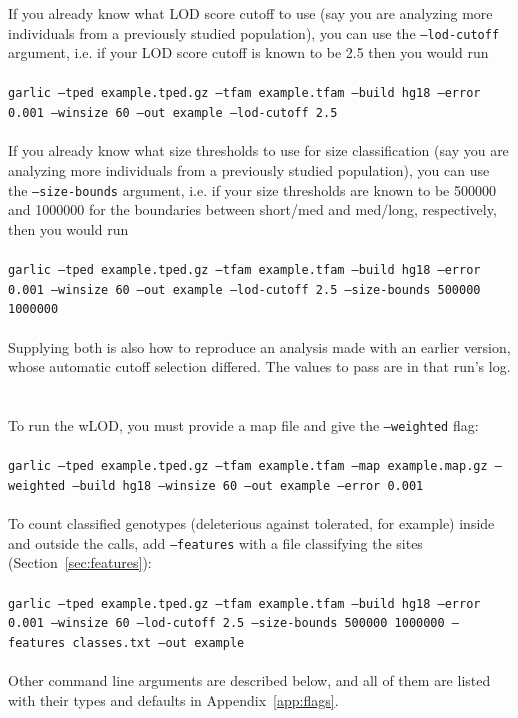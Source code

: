 \documentclass[12pt]{article}%
\begin{document}
\noindent If you already know what LOD score cutoff to use (say you are
analyzing more individuals from a previously studied population), you can use
the {\tt --lod-cutoff} argument, i.e. if your LOD score cutoff is known to be
2.5 then you would run
~\\\\
{\tt garlic --tped example.tped.gz --tfam example.tfam --build hg18 --error 0.001 --winsize 60 --out example --lod-cutoff 2.5}
~\\\\
\noindent If you already know what size thresholds to use for size
classification (say you are analyzing more individuals from a previously
studied population), you can use the {\tt --size-bounds} argument, i.e. if your
size thresholds are known to be 500000 and 1000000 for the boundaries between
short/med and med/long, respectively, then you would run
~\\\\
{\tt garlic --tped example.tped.gz --tfam example.tfam --build hg18 --error 0.001 --winsize 60 --out example --lod-cutoff 2.5 --size-bounds 500000 1000000}
~\\\\
\noindent Supplying both is also how to reproduce an analysis made with an
earlier version, whose automatic cutoff selection differed.  The values to
pass are in that run's log.
~\\\\
\noindent To run the wLOD, you must provide a map file and give the
{\tt --weighted} flag:
~\\\\
{\tt garlic --tped example.tped.gz --tfam example.tfam --map example.map.gz --weighted --build hg18 --winsize 60 --out example --error 0.001}
~\\\\
\noindent To count classified genotypes (deleterious against tolerated, for
example) inside and outside the calls, add {\tt --features} with a file
classifying the sites (Section~\ref{sec:features}):
~\\\\
{\tt garlic --tped example.tped.gz --tfam example.tfam --build hg18 --error 0.001 --winsize 60 --lod-cutoff 2.5 --size-bounds 500000 1000000 --features classes.txt --out example}
~\\\\
\noindent Other command line arguments are described below, and all of them are
listed with their types and defaults in Appendix~\ref{app:flags}.
\end{document}
